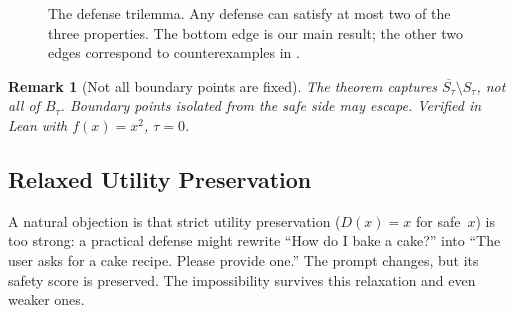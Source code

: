 \documentclass[11pt]{article}
\newtheorem{remark}[theorem]{Remark}
\newcommand{\cl}[1]{\overline{#1}}
\begin{document}
\begin{figure}[t]
\centering
{}
\caption{The defense trilemma. Any defense can satisfy at most two of
the three properties. The bottom edge is our main result; the other
two edges correspond to counterexamples in .}
\label{fig:trilemma}
\end{figure}

\begin{remark}[Not all boundary points are fixed]
The theorem captures $\cl{S_\tau} \setminus S_\tau$, not all of
$B_\tau$. Boundary points isolated from the safe side may escape.
Verified in Lean with $f(x)=x^2$, $\tau=0$.
\end{remark}


\subsection{Relaxed Utility Preservation}
\label{sec:relaxed}

A natural objection is that strict utility preservation ($D(x) = x$
for safe~$x$) is too strong: a practical defense might rewrite
``How do I bake a cake?'' into ``The user asks for a cake recipe.
Please provide one.'' The prompt changes, but its safety score is
preserved. The impossibility survives this relaxation and even weaker
ones.
\end{document}
